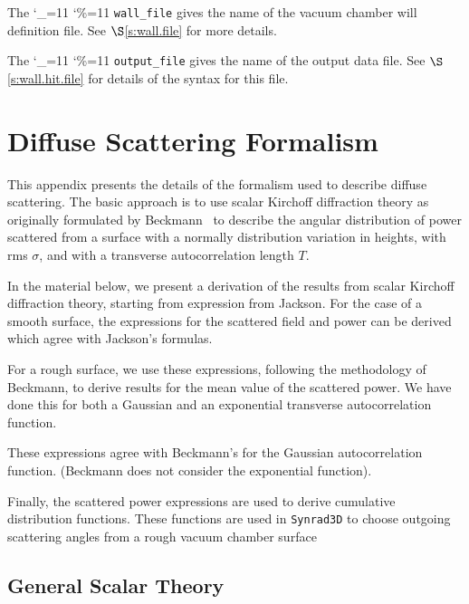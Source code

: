 \documentclass[11pt,openany]{report}
\newcommand{\sref}[1]{$\S$\ref{#1}}
\newcommand{\srthree}{\texttt{Synrad3D}\xspace}
\newcommand\ttcmd{\begingroup\catcode`\_=11 \catcode`\%=11 \dottcmd}
\newcommand\dottcmd[1]{\texttt{#1}\endgroup}
\newcommand{\vn}{\ttcmd}
\begin{document}
{{The \vn{wall_file} gives the name of the vacuum chamber will
definition file. See \sref{s:wall.file} for more details.

The \vn{output_file} gives the name of the output data file.
See \sref{s:wall.hit.file} for details of the syntax for this file.

\appendix
\chapter{Diffuse Scattering Formalism}

This appendix presents the details of the formalism used to describe
diffuse scattering. The basic approach is to use scalar Kirchoff
diffraction theory as originally formulated by
Beckmann~\cite{b:beckmann} to describe the angular distribution of
power scattered from a surface with a normally distribution variation
in heights, with rms $\sigma$, and with a transverse autocorrelation
length $T$.

In the material below, we present a derivation of the results from
scalar Kirchoff diffraction theory, starting from expression from
Jackson. For the case of a smooth surface, the expressions for the
scattered field and power can be derived which agree with Jackson's
formulas.

For a rough surface, we use these expressions, following the
methodology of Beckmann, to derive results for the mean value of the
scattered power. We have done this for both a Gaussian and an
exponential transverse autocorrelation function.

These expressions agree with Beckmann's for the Gaussian
autocorrelation function. (Beckmann does not consider the exponential
function).

Finally, the scattered power expressions are used to derive cumulative
distribution functions. These functions are used in \srthree to choose
outgoing scattering angles from a rough vacuum chamber surface

\section{General Scalar Theory} 

}}
\end{document}
